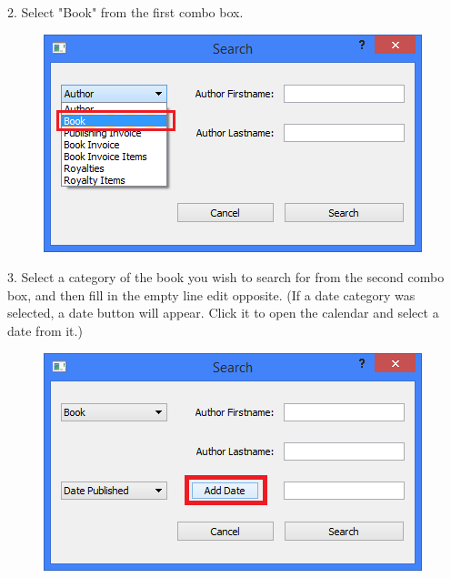2. Select "Book" from the first combo box.

\begin{figure}[H]
    \includegraphics[width=\textwidth]{./Manual/Tutorial/Q14/BookComboBox.png}
\end{figure}

3. Select a category of the book you wish to search for from the second combo box, and then fill in the empty line edit opposite. (If a date category was selected, a date button will appear. Click it to open the calendar and select a date from it.)

\begin{figure}[H]
    \includegraphics[width=\textwidth]{./Manual/Tutorial/Q14/DateSearch.png}
\end{figure}

